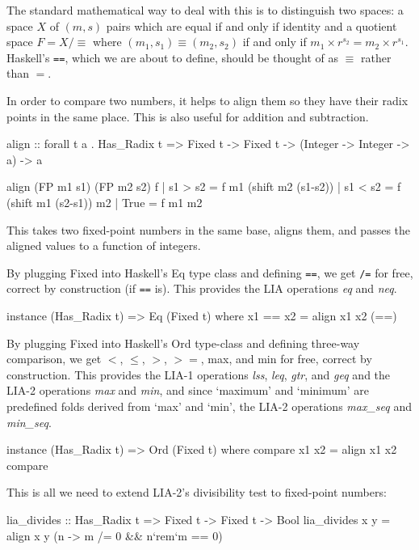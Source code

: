 \documentclass{article}
\begin{document}
\begin{code}
The standard mathematical way to deal with this is to distinguish
two spaces:  a space $X$ of $(m,s)$ pairs which are equal if and
only if identity and a quotient space $F = X/\equiv$ where
$(m_1,s_1) \equiv (m_2,s_2)$ if and only if $m_1\times r^{s_2} =
m_2 \times r^{s_1}$.  Haskell's \verb|==|, which we are about to
define, should be thought of as $\equiv$ rather than $=$.

In order to compare two numbers, it helps to align them so they
have their radix points in the same place.  This is also useful
for addition and subtraction.

\begin{code}
align :: forall t a . Has_Radix t =>
    Fixed t -> Fixed t -> (Integer -> Integer -> a) -> a

align (FP m1 s1) (FP m2 s2) f
  | s1 > s2 = f m1 (shift m2 (s1-s2))
  | s1 < s2 = f (shift m1 (s2-s1)) m2
  | True    = f m1 m2
\end{code}

This takes two fixed-point numbers in the same base, aligns them,
and passes the aligned values to a function of integers.

By plugging Fixed into Haskell's Eq type class and
defining \verb|==|, we get \verb|/=| for free, correct by
construction (if \verb|==| is).  This provides
the LIA operations {\it eq} and {\it neq}.

\begin{code}
instance (Has_Radix t) => Eq (Fixed t)
  where x1 == x2 = align x1 x2 (==)
\end{code}

By plugging Fixed into Haskell's Ord type-class and
defining three-way comparison, we get $<$, $\le$, $>$, $>=$,
max, and min for free, correct by construction.
This provides the LIA-1 operations {\it lss},
{\it leq}, {\it gtr}, and {\it geq} and the LIA-2 operations
{\it max} and {\it min}, and since `maximum' and `minimum' are
predefined folds derived from `max' and `min', the LIA-2
operations {\it max\_seq} and {\it min\_seq}.

\begin{code}
instance (Has_Radix t) => Ord (Fixed t)
  where compare x1 x2 = align x1 x2 compare
\end{code}

This is all we need to extend LIA-2's divisibility test to
fixed-point numbers:
\begin{code}
lia_divides :: Has_Radix t => Fixed t -> Fixed t -> Bool
lia_divides x y = align x y (\m n -> m /= 0 && n`rem`m == 0)
\end{code}


\end{code}
\end{document}
